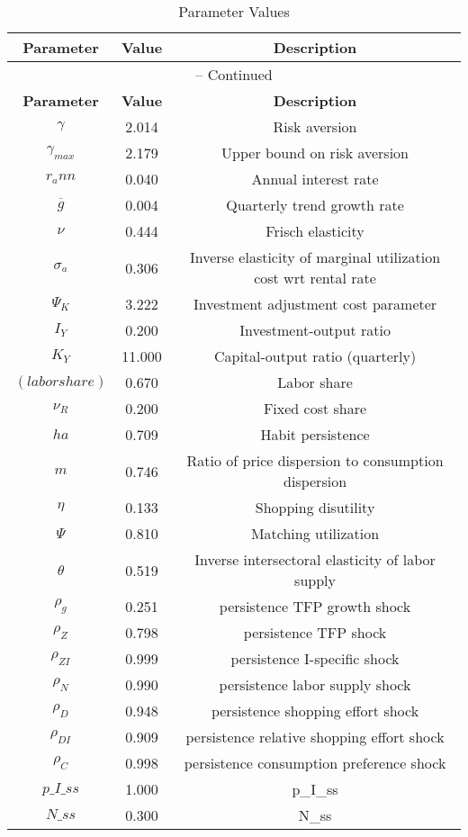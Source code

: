 \begin{center}
\begin{longtable}{ccc}
\caption{Parameter Values}\\%
\toprule%
\multicolumn{1}{c}{\textbf{Parameter}} &
\multicolumn{1}{c}{\textbf{Value}} &
 \multicolumn{1}{c}{\textbf{Description}}\\%
\midrule%
\endfirsthead
\multicolumn{3}{c}{{\tablename} \thetable{} -- Continued}\\%
\midrule%
\multicolumn{1}{c}{\textbf{Parameter}} &
\multicolumn{1}{c}{\textbf{Value}} &
  \multicolumn{1}{c}{\textbf{Description}}\\%
\midrule%
\endhead
${\gamma}$ 	 & 	 2.014 	 & 	 Risk aversion\\
${\gamma_{max}}$ 	 & 	 2.179 	 & 	 Upper bound on risk aversion\\
${r_ann}$ 	 & 	 0.040 	 & 	 Annual interest rate\\
${\overline{g}}$ 	 & 	 0.004 	 & 	 Quarterly trend growth rate\\
$\nu$ 	 & 	 0.444 	 & 	 Frisch elasticity\\
${\sigma_a}$ 	 & 	 0.306 	 & 	 Inverse elasticity of marginal utilization cost wrt rental rate\\
${\Psi_K}$ 	 & 	 3.222 	 & 	 Investment adjustment cost parameter\\
${I_Y}$ 	 & 	 0.200 	 & 	 Investment-output ratio\\
${K_Y}$ 	 & 	 11.000 	 & 	 Capital-output ratio (quarterly)\\
$(labor share)$ 	 & 	 0.670 	 & 	 Labor share\\
${\nu_R}$ 	 & 	 0.200 	 & 	 Fixed cost share\\
${ha}$ 	 & 	 0.709 	 & 	 Habit persistence\\
${m}$ 	 & 	 0.746 	 & 	 Ratio of price dispersion to consumption dispersion\\
${\eta}$ 	 & 	 0.133 	 & 	 Shopping disutility\\
${\Psi}$ 	 & 	 0.810 	 & 	 Matching utilization\\
${\theta}$ 	 & 	 0.519 	 & 	 Inverse intersectoral elasticity of labor supply\\
${\rho_g}$ 	 & 	 0.251 	 & 	 persistence TFP growth shock\\
${\rho_Z}$ 	 & 	 0.798 	 & 	 persistence TFP shock\\
${\rho_{ZI}}$ 	 & 	 0.999 	 & 	 persistence I-specific shock\\
${\rho_N}$ 	 & 	 0.990 	 & 	 persistence labor supply shock\\
${\rho_D}$ 	 & 	 0.948 	 & 	 persistence shopping effort shock\\
${\rho_{DI}}$ 	 & 	 0.909 	 & 	 persistence relative shopping effort shock\\
${\rho_C}$ 	 & 	 0.998 	 & 	 persistence consumption preference shock\\
$p\_I\_ss$ 	 & 	 1.000 	 & 	 p\_I\_ss\\
$N\_ss$ 	 & 	 0.300 	 & 	 N\_ss\\
\bottomrule%
\end{longtable}
\end{center}
